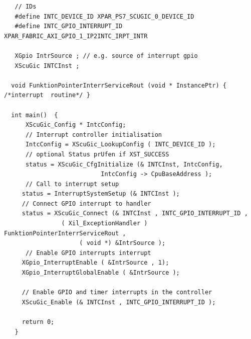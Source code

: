 \begin{verbatim}
   // IDs
   #define INTC_DEVICE_ID XPAR_PS7_SCUGIC_0_DEVICE_ID
   #define INTC_GPIO_INTERRUPT_ID XPAR_FABRIC_AXI_GPIO_1_IP2INTC_IRPT_INTR
 	
   XGpio IntrSource ; // e.g. source of interrupt gpio
   XScuGic INTCInst ;
   
  void FunktionPointerInterrServiceRout (void * InstancePtr) { /*interrupt  routine*/ }

  int main()  {
      XScuGic_Config * IntcConfig;
      // Interrupt controller initialisation
      IntcConfig = XScuGic_LookupConfig ( INTC_DEVICE_ID );
      // optional Status prUfen if XST_SUCCESS
      status = XScuGic_CfgInitialize (& INTCInst, IntcConfig,
                           IntcConfig -> CpuBaseAddress );
      // Call to interrupt setup       
     status = InterruptSystemSetup (& INTCInst );
     // Connect GPIO interrupt to handler
     status = XScuGic_Connect (& INTCInst , INTC_GPIO_INTERRUPT_ID ,
                ( Xil_ExceptionHandler ) FunktionPointerInterrServiceRout ,
                     ( void *) &IntrSource );
      // Enable GPIO interrupts interrupt
     XGpio_InterruptEnable ( &IntrSource , 1);
     XGpio_InterruptGlobalEnable ( &IntrSource );

     // Enable GPIO and timer interrupts in the controller
     XScuGic_Enable (& INTCInst , INTC_GPIO_INTERRUPT_ID );

     return 0;
   }
 \end{verbatim}